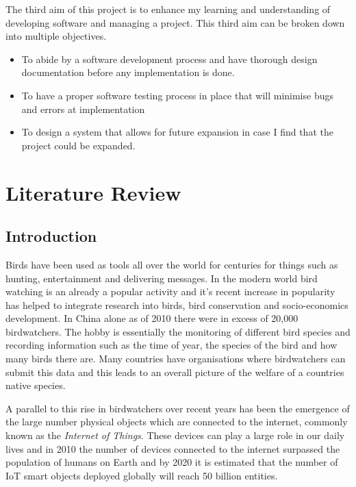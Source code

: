 \documentclass[10pt,a4paper]{article}
\begin{document}
The third aim of this project is to enhance my learning and understanding of developing software and managing a project. This third aim can be broken down into multiple objectives. 
\begin{itemize}
\item To abide by a software development process and have thorough design documentation before any implementation is done. 

\item To have a proper software testing process in place that will minimise bugs and errors at implementation

\item To design a system that allows for future expansion in case I find that the project could be expanded. 
\end{itemize}

\pagebreak
\section{Literature Review}
\subsection{Introduction}
Birds have been used as tools all over the world for centuries for things such as hunting, entertainment and delivering messages. In the modern world bird watching is an already a popular activity and it's recent increase in popularity has helped to integrate research into birds, bird conservation and socio-economics development\cite{Zhijun2013}. In China alone as of 2010 there were in excess of 20,000 birdwatchers\cite{Zhijun2013}. The hobby is essentially the monitoring of different bird species and recording information such as the time of year, the species of the bird and how many birds there are. Many countries have organisations where birdwatchers can submit this data and this leads to an overall picture of the welfare of a countries native species.

A parallel to this rise in birdwatchers over recent years has been the emergence of the large number physical objects which are connected to the internet, commonly known as the \textit{Internet of Things}. These devices can play a large role in our daily lives and in 2010 the number of devices connected to the internet surpassed the population of humans on Earth\cite{AlFuqaha2015} and by 2020 it is estimated that the number of IoT smart objects deployed globally will reach 50 billion entities\cite{Arumuga2017}. 
\end{document}
